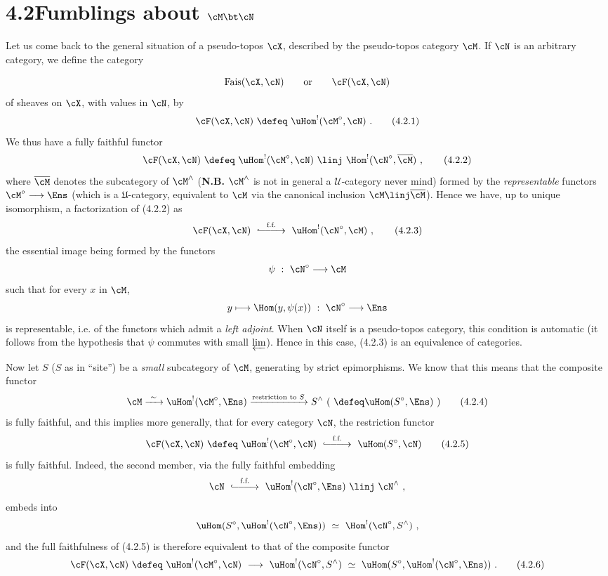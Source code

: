 \section*{4.2\quad Fumblings about $\cM \bt \cN$}

Let us come back to the general situation of a pseudo-topos $\cX$, described by the pseudo-topos category $\cM$. If $\cN$ is an arbitrary category, we define the category

\[
\mathrm{Fais}(\cX,\cN) \qquad \text{or} \qquad \cF(\cX,\cN)
\]
of sheaves on $\cX$, with values in $\cN$, by
\[
\cF(\cX,\cN) \ \defeq\ \uHom^{!}(\cM^{\circ},\cN) \ .
\tag*{(4.2.1)}
\]
We thus have a fully faithful functor
\[
\cF(\cX,\cN) \ \defeq\ \uHom^{!}(\cM^{\circ},\cN) \ \linj\ \Hom^{!}(\cN^{\circ},\overline{\cM}) \ ,
\tag*{(4.2.2)}
\]
where $\overline{\cM}$ denotes the subcategory of $\cM^{\wedge}$ (\textbf{N.B.} $\cM^{\wedge}$ is not in general a $\mathcal{U}$-category never mind) formed by the \textit{representable} functors $\cM^{\circ}\longrightarrow\Ens$ (which is a $\mathfrak{U}$-category, equivalent to $\cM$ via the canonical inclusion $\cM \linj \overline{\cM}$). Hence we have, up to unique isomorphism, a factorization of (4.2.2) as
\[
\cF(\cX,\cN) \ \overset{\text{f.f.}}{\lhook\joinrel\relbar\joinrel\relbar\joinrel\longrightarrow}\ \uHom^{!}(\cN^{\circ},\cM) \ ,
\tag*{(4.2.3)}
\]
the essential image being formed by the functors
\[
\psi \ :\ \cN^{\circ} \longrightarrow \cM
\]
such that for every $x$ in $\cM$,
\[
y \longmapsto \Hom(y,\psi(x)) \ :\ \cN^{\circ} \longrightarrow \Ens
\]
is representable, i.e. of the functors which
admit a \textit{left adjoint}. When $\cN$ itself is a pseudo-topos category, this condition is automatic (it follows from the hypothesis that $\psi$ commutes with small $\varprojlim$). Hence in this case, (4.2.3) is an equivalence of categories.

Now let $S$ ($S$ as in ``site'') be a \textit{small} subcategory of $\cM$, generating by strict epimorphisms. We know that this means that the composite functor
\[
\cM \xrightarrow{\ \sim\ } \uHom^{!}(\cM^{\circ},\Ens) \xrightarrow{\text{restriction to } S} S^{\wedge} \ (\ \defeq \uHom(S^{\circ},\Ens)\ )
\tag*{(4.2.4)}
\]
is fully faithful, and this implies more generally, that for every category $\cN$, the restriction functor
\[
\cF(\cX,\cN) \ \defeq\ \uHom^{!}(\cM^{\circ},\cN) \ \overset{\text{f.f.}}{\lhook\joinrel\relbar\joinrel\relbar\joinrel\longrightarrow}\ \uHom(S^{\circ},\cN)
\tag*{(4.2.5)}
\]
is fully faithful. Indeed, the second member, via the fully faithful embedding
\[
\cN \ \overset{\text{f.f.}}{\lhook\joinrel\relbar\joinrel\relbar\joinrel\longrightarrow}\ \uHom^{!}(\cN^{\circ},\Ens) \ \linj\ \cN^{\wedge} \ ,
\]
embeds into
\[
\uHom(S^{\circ},\uHom^{!}(\cN^{\circ},\Ens)) \ \simeq\ \Hom^{!}(\cN^{\circ},S^{\wedge}) \ ,
\]
and the full faithfulness of (4.2.5) is therefore equivalent to that of the composite functor
\[
\cF(\cX,\cN) \ \defeq\ \uHom^{!}(\cM^{\circ},\cN) \ \longrightarrow\ \uHom^{!}(\cN^{\circ},S^{\wedge}) \ \simeq\ \uHom(S^{\circ},\uHom^{!}(\cN^{\circ},\Ens)) \ .
\tag*{(4.2.6)}
\]


